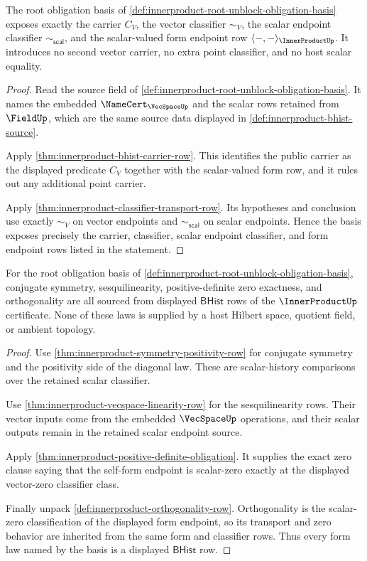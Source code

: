 \begin{theorem}
\label{thm:innerproduct-root-unblock-carrier-classifier}
The root obligation basis of
\autoref{def:innerproduct-root-unblock-obligation-basis} exposes exactly the
carrier $C_V$, the vector classifier $\sim_V$, the scalar endpoint classifier
$\sim_{\mathsf{scal}}$, and the scalar-valued form endpoint row
$\langle-,-\rangle_{\InnerProductUp}$. It introduces no second vector
carrier, no extra point classifier, and no host scalar equality.
\end{theorem}
\begin{proof}
Read the source field of
\autoref{def:innerproduct-root-unblock-obligation-basis}. It names the
embedded $\NameCert_{\VecSpaceUp}$ and the scalar rows retained from
$\FieldUp$, which are the same source data displayed in
\autoref{def:innerproduct-bhist-source}.

Apply \autoref{thm:innerproduct-bhist-carrier-row}. This identifies the
public carrier as the displayed predicate $C_V$ together with the
scalar-valued form row, and it rules out any additional point carrier.

Apply \autoref{thm:innerproduct-classifier-transport-row}. Its hypotheses and
conclusion use exactly $\sim_V$ on vector endpoints and
$\sim_{\mathsf{scal}}$ on scalar endpoints. Hence the basis exposes precisely
the carrier, classifier, scalar endpoint classifier, and form endpoint rows
listed in the statement.
\end{proof}

\begin{theorem}
\label{thm:innerproduct-root-unblock-form-laws}
For the root obligation basis of
\autoref{def:innerproduct-root-unblock-obligation-basis}, conjugate symmetry,
sesquilinearity, positive-definite zero exactness, and orthogonality are all
sourced from displayed $\mathsf{BHist}$ rows of the $\InnerProductUp$
certificate. None of these laws is supplied by a host Hilbert space, quotient
field, or ambient topology.
\end{theorem}
\begin{proof}
Use \autoref{thm:innerproduct-symmetry-positivity-row} for conjugate symmetry
and the positivity side of the diagonal law. These are scalar-history
comparisons over the retained scalar classifier.

Use \autoref{thm:innerproduct-vecspace-linearity-row} for the
sesquilinearity rows. Their vector inputs come from the embedded
$\VecSpaceUp$ operations, and their scalar outputs remain in the retained
scalar endpoint source.

Apply \autoref{thm:innerproduct-positive-definite-obligation}. It supplies
the exact zero clause saying that the self-form endpoint is scalar-zero
exactly at the displayed vector-zero classifier class.

Finally unpack \autoref{def:innerproduct-orthogonality-row}. Orthogonality is
the scalar-zero classification of the displayed form endpoint, so its
transport and zero behavior are inherited from the same form and classifier
rows. Thus every form law named by the basis is a displayed
$\mathsf{BHist}$ row.
\end{proof}

